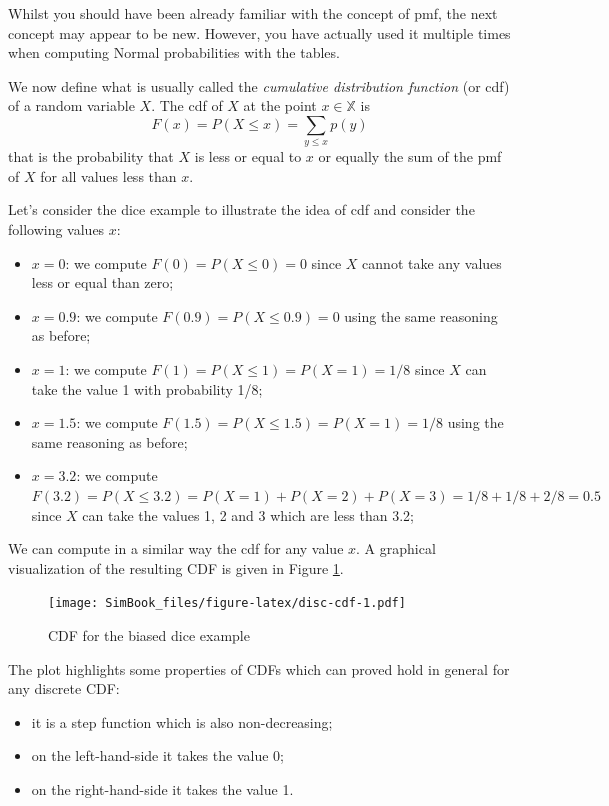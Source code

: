 \documentclass[
]{book}
\begin{document}
Whilst you should have been already familiar with the concept of pmf, the next concept may appear to be new. However, you have actually used it multiple times when computing Normal probabilities with the tables.

We now define what is usually called the \emph{cumulative distribution function} (or cdf) of a random variable \(X\). The cdf of \(X\) at the point \(x\in\mathbb{X}\) is
\[
F(x) = P(X \leq x) = \sum_{y \leq x} p(y)
\]
that is the probability that \(X\) is less or equal to \(x\) or equally the sum of the pmf of \(X\) for all values less than \(x\).

Let's consider the dice example to illustrate the idea of cdf and consider the following values \(x\):

\begin{itemize}
\item
  \(x=0\): we compute \(F(0) = P(X\leq 0 )= 0\) since \(X\) cannot take any values less or equal than zero;
\item
  \(x= 0.9\): we compute \(F(0.9)= P(X\leq 0.9) = 0\) using the same reasoning as before;
\item
  \(x = 1\): we compute \(F(1)= P(X\leq 1) = P(X=1) = 1/8\) since \(X\) can take the value 1 with probability 1/8;
\item
  \(x = 1.5\): we compute \(F(1.5) = P(X\leq 1.5) = P(X=1) = 1/8\) using the same reasoning as before;
\item
  \(x = 3.2\): we compute \(F(3.2)=P(X\leq 3.2)=P(X=1)+ P(X=2) + P(X=3)=1/8 + 1/8 + 2/8 = 0.5\) since \(X\) can take the values 1, 2 and 3 which are less than 3.2;
\end{itemize}

We can compute in a similar way the cdf for any value \(x\). A graphical visualization of the resulting CDF is given in Figure \ref{fig:disc-cdf}.

\begin{figure}
\centering
\texttt{[image: SimBook\_files/figure-latex/disc-cdf-1.pdf]}
\caption{\label{fig:disc-cdf}CDF for the biased dice example}
\end{figure}

The plot highlights some properties of CDFs which can proved hold in general for any discrete CDF:

\begin{itemize}
\item
  it is a step function which is also non-decreasing;
\item
  on the left-hand-side it takes the value 0;
\item
  on the right-hand-side it takes the value 1.
\end{itemize}
\end{document}
